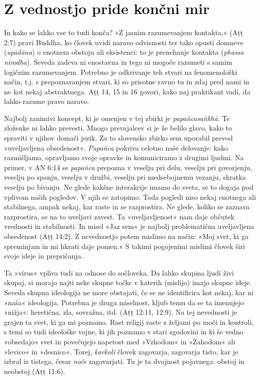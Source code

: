 \section{Z vednostjo pride končni mir}

In kako se lahko vse to tudi konča? »Z jasnim razumevanjem kontakta,«
(Aṭṭ 2:7) pravi Buddha, ko človek uvidi naravo odvisnosti ter tako
opusti domneve (\emph{upādāna}) o enotnem obstoju ali eksistenci: to je
prenehanje kontakta (\emph{phassa nirodha}). Seveda zadeva ni enostavna
in tega ni mogoče razumeti s samim logičnim razumevanjem. Potrebno je
odkrivanje teh stvari na fenomenološki način, t.j. s prepoznavanjem
stvari, ki so prisotne ravno tu in zdaj pred nami in ne kot nekaj
abstraktnega. Aṭṭ 14, 15 in 16 govori, kako naj praktikant vadi, da
lahko razume pravo naravo.

Najbolj zanimivi koncept, ki je omenjen v tej zbirki je
\emph{papañcasaṅkhā}. Te zloženke ni lahko prevesti. Mnogo prevajalcev
si je že belilo glavo, kako to spraviti v njihov domači jezik. Za to
slovensko zbirko sem uporabil prevod »uveljavljena obsedenost«.
\emph{Papañca} pokriva celotno naše delovanje: kako razmišljamo,
opravljamo svoje opravke in komuniciramo z drugimi ljudmi. Na primer, v
AN 6:14 se \emph{papañca} prepozna v veselju pri delu, veselju pri
govorjenju, veselju po spanju, veselju v družbi, veselju pri
medsebojnemu vezanju, skratka veselju po bivanju. Ne glede kakšne
interakcije imamo do sveta, se to dogaja pod vplivom naših pogledov. V
njih se zatopimo. Toda pogledi niso nekaj enotnega ali stabilnega, ampak
nekaj, kar raste in se razprostira. Ne glede, koliko se zaznava
razprostira, se na to uveljavi zavest. Ta »uveljavljenost« nam daje
občutek vrednosti in stabilnosti. In misel »Jaz sem« je najbolj
problematična uveljavljena obsedenost (Aṭṭ 14:2). Z nevednostjo potem
mislimo na način: »Moj svet, ki ga spreminjam in mi hkrati daje pomen.«
S takimi pogojenimi mislimi človek širi svoje ideje in prepričanja.

Ta »virus« vpliva tudi na odnose do sočloveka. Da lahko skupina ljudi
živi skupaj, si morajo najti neke skupne točke v katerih (mislijo) imajo
skupne ideje. Seveda skupna ideologija ne more obstajati, če se ne
identificira kot nekaj, kar ni »naša« ideologija. Potrebna je druga
miselnost, kljub temu da se ta imenujejo »nižja«: heretična, zla,
sovražna, itd. (Aṭṭ 12:11, 12:9). Na tej nevednosti je grajen ta svet,
ki ga mi poznamo. Rast religij raste z željami po moči in kontroli, s
temi so tudi ideološke vojne, ki jih poznamo v stari zgodovini in ki še
vedno »obsedajo« svet in povečujejo napetost med »Vzhodom« in »Zahodom«
ali »levico« in »desnico«. Torej, \emph{karkoli} človek zagovarja,
zagovarja tisto, kar je izbral iz tistega, česar \emph{noče}
zagovarjati. Tu je ta dvojnost pojavnega: obstoj in neobstoj (Aṭṭ 11:6).

